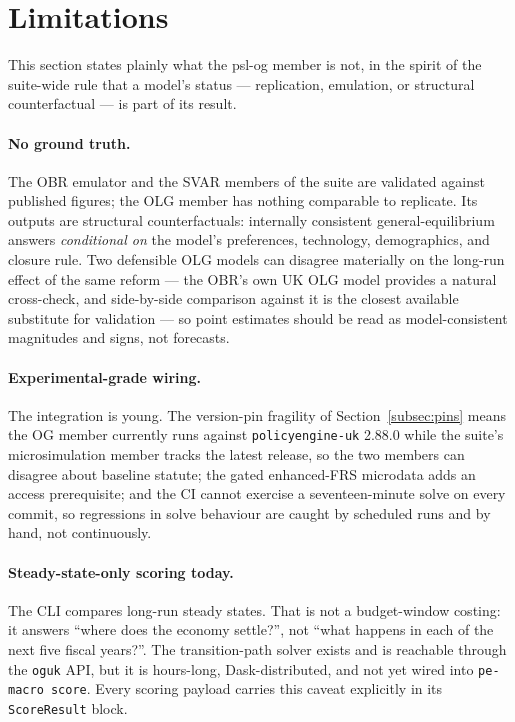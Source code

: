 \section{Limitations}
\label{sec:limitations}

This section states plainly what the psl-og member is not, in the spirit of the suite-wide rule that a model's status --- replication, emulation, or structural counterfactual --- is part of its result.

\paragraph{No ground truth.} The OBR emulator and the SVAR members of the suite are validated against published figures; the OLG member has nothing comparable to replicate. Its outputs are structural counterfactuals: internally consistent general-equilibrium answers \emph{conditional on} the model's preferences, technology, demographics, and closure rule. Two defensible OLG models can disagree materially on the long-run effect of the same reform --- the OBR's own UK OLG model \citep{OBR2025OLG} provides a natural cross-check, and side-by-side comparison against it is the closest available substitute for validation --- so point estimates should be read as model-consistent magnitudes and signs, not forecasts.

\paragraph{Experimental-grade wiring.} The integration is young. The version-pin fragility of Section~\ref{subsec:pins} means the OG member currently runs against \texttt{policyengine-uk} 2.88.0 while the suite's microsimulation member tracks the latest release, so the two members can disagree about baseline statute; the gated enhanced-FRS microdata adds an access prerequisite; and the CI cannot exercise a seventeen-minute solve on every commit, so regressions in solve behaviour are caught by scheduled runs and by hand, not continuously.

\paragraph{Steady-state-only scoring today.} The CLI compares long-run steady states. That is not a budget-window costing: it answers ``where does the economy settle?'', not ``what happens in each of the next five fiscal years?''. The transition-path solver exists and is reachable through the \texttt{oguk} API, but it is hours-long, Dask-distributed, and not yet wired into \texttt{pe-macro score}. Every scoring payload carries this caveat explicitly in its \texttt{ScoreResult} block.


